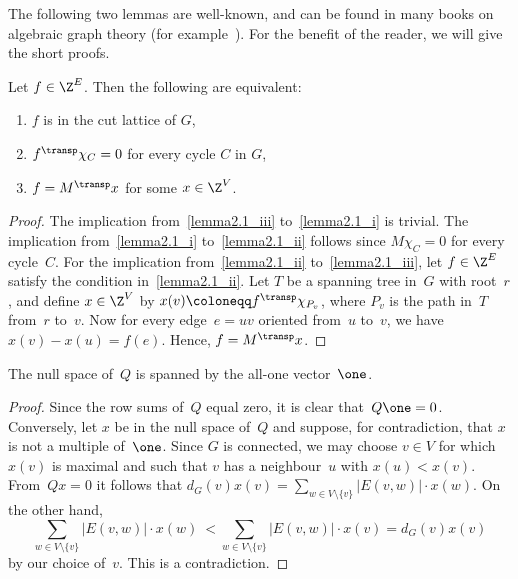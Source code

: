 The following two lemmas are well-known, and can be found in many books on algebraic graph theory (for example~\cite{GodsilRoyle2001}). For the benefit of the reader, we will give the short proofs.
 
\begin{lemma}\label{clattice}
Let $f\in \Z^{E}$. Then the following are equivalent:
\begin{enumerate}[label=(\roman*)]
\item\label{lemma2.1_i} $f$ is in the cut lattice of $G$,
\item\label{lemma2.1_ii} $f^\transp\chi_C=0$ for every cycle $C$ in $G$,
\item\label{lemma2.1_iii} $f=M^\transp x$ for some $x\in \Z^{V}$.
\end{enumerate}
\end{lemma} 
\begin{proof}
The implication from~\ref{lemma2.1_iii} to~\ref{lemma2.1_i} is trivial. The implication from~\ref{lemma2.1_i} to~\ref{lemma2.1_ii} follows since $M\chi_C=0$ for every cycle~$C$. For the implication from~\ref{lemma2.1_ii} to~\ref{lemma2.1_iii}, let $f\in \Z^{E}$ satisfy the condition in~\ref{lemma2.1_ii}. Let $T$ be a spanning tree in~$G$ with root~$r$, and define $x\in \Z^V$ by $x(v)\coloneqq f^\transp\chi_{P_v}$, where $P_v$ is the path in~$T$ from~$r$ to~$v$. Now for every edge~$e=uv$ oriented from~$u$ to~$v$, we have $x(v)-x(u)=f(e)$. Hence, $f=M^\transp x$.
\end{proof}

\begin{lemma}\label{Laplacian}
The null space of~$Q$ is spanned by the all-one vector~$\one$.
\end{lemma}
\begin{proof}
Since the row sums of~$Q$ equal zero, it is clear that~$Q\one=0$. Conversely, let $x$ be in the null space of~$Q$ and suppose, for contradiction, that $x$ is not a multiple of~$\one$. Since $G$ is connected, we may choose $v\in V$ for which $x(v)$ is maximal and such that $v$ has a neighbour~$u$ with $x(u) < x(v)$. From~$Qx=0$ it follows that $d_G(v)x(v)=\sum_{w\in V\setminus\{v\}} |E(v,w)|\cdot x(w)$. On the other hand,
\begin{equation*}
\sum_{w\in V\setminus\{v\}}|E(v,w)|\cdot x(w)\ < \sum_{w\in V\setminus\{v\}}|E(v,w)|\cdot x(v)= d_G(v)x(v)
\end{equation*}
by our choice of~$v$. This is a contradiction. 
\end{proof}

